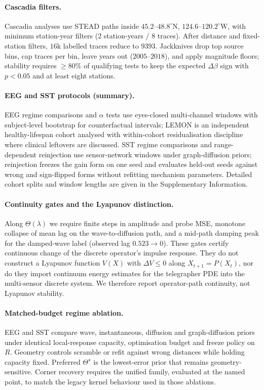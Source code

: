 \documentclass[twocolumn,10pt]{article}
\newcommand{\stead}{\textsc{STEAD}}
\begin{document}
\paragraph{Cascadia filters.}
Cascadia analyses use \stead{} paths inside
\(45.2\)--\(48.8^\circ\mathrm{N}\), \(124.6\)--\(120.2^\circ\mathrm{W}\), with
minimum station-year filters (\(2\) station-years / \(8\) traces). After
distance and fixed-station filters, \(16\mathrm{k}\) labelled traces reduce to
\(9393\). Jackknives drop top source bins, cap traces per bin, leave years out
(\(2005\)--\(2018\)), and apply magnitude floors; stability requires
\(\ge80\%\) of qualifying tests to keep the expected \(\Delta\beta\) sign with
\(p<0.05\) and at least eight stations.

\paragraph{EEG and SST protocols (summary).}
EEG regime comparisons and \(\alpha\) tests use eyes-closed multi-channel
windows with subject-level bootstrap for counterfactual intervals; LEMON is an
independent healthy-lifespan cohort analysed with within-cohort residualisation
discipline where clinical leftovers are discussed. SST regime comparisons and
range-dependent reinjection use sensor-network windows under graph-diffusion
priors; reinjection freezes the gain form on one seed and evaluates held-out
seeds against wrong and sign-flipped forms without refitting mechanism
parameters. Detailed cohort splits and window lengths are given in the
Supplementary Information.

\paragraph{Continuity gates and the Lyapunov distinction.}
Along \(\Theta(\lambda)\) we require finite steps in amplitude and probe MSE,
monotone collapse of mean lag on the wave-to-diffusion path, and a mid-path
damping peak for the damped-wave label (observed lag
\(0.523\rightarrow0\)). These gates certify continuous change of the discrete
operator's impulse response. They do not construct a Lyapunov function \(V(X)\)
with \(\Delta V\le0\) along \(X_{t+1}=P(X_t)\), nor do they import continuum
energy estimates for the telegrapher PDE into the multi-sensor discrete system.
We therefore report operator-path continuity, not Lyapunov stability.

\paragraph{Matched-budget regime ablation.}
EEG and SST compare wave, instantaneous, diffusion and graph-diffusion priors
under identical local-response capacity, optimisation budget and freeze policy
on \(R\). Geometry controls scramble or refit against wrong distances while
holding capacity fixed. Preferred \(\Theta^{\star}\) is the lowest-error prior
that remains geometry-sensitive. Corner recovery requires the unified family,
evaluated at the named point, to match the legacy kernel behaviour used in those
ablations.
\end{document}

